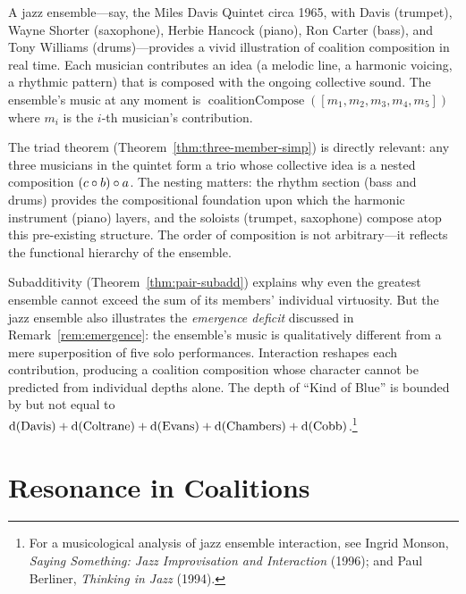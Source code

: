 \begin{example}
\label{ex:jazz}
A jazz ensemble---say, the Miles Davis Quintet circa 1965, with Davis
(trumpet), Wayne Shorter (saxophone), Herbie Hancock (piano), Ron Carter
(bass), and Tony Williams (drums)---provides a vivid illustration of
coalition composition in real time.  Each musician contributes an idea
(a melodic line, a harmonic voicing, a rhythmic pattern) that is
composed with the ongoing collective sound.  The ensemble's music at
any moment is $\operatorname{coalitionCompose}([m_1, m_2, m_3, m_4, m_5])$
where $m_i$ is the $i$-th musician's contribution.

The triad theorem (Theorem~\ref{thm:three-member-simp}) is directly
relevant: any three musicians in the quintet form a trio whose collective
idea is a nested composition $(c \circ b) \circ a$.  The nesting
matters: the rhythm section (bass and drums) provides the compositional
foundation upon which the harmonic instrument (piano) layers, and the
soloists (trumpet, saxophone) compose atop this pre-existing structure.
The order of composition is not arbitrary---it reflects the functional
hierarchy of the ensemble.

Subadditivity (Theorem~\ref{thm:pair-subadd}) explains why even the
greatest ensemble cannot exceed the sum of its members' individual
virtuosity.  But the jazz ensemble also illustrates the \emph{emergence
deficit} discussed in Remark~\ref{rem:emergence}: the ensemble's music is
qualitatively different from a mere superposition of five solo
performances.  Interaction reshapes each contribution, producing a
coalition composition whose character cannot be predicted from individual
depths alone.  The depth of ``Kind of Blue'' is bounded by but not equal to
$\operatorname{d}(\text{Davis}) + \operatorname{d}(\text{Coltrane}) + \operatorname{d}(\text{Evans}) +
\operatorname{d}(\text{Chambers}) + \operatorname{d}(\text{Cobb})$.\footnote{For a
musicological analysis of jazz ensemble interaction, see Ingrid Monson,
\textit{Saying Something: Jazz Improvisation and Interaction} (1996);
and Paul Berliner, \textit{Thinking in Jazz} (1994).}
\end{example}

\section{Resonance in Coalitions}
\label{sec:ch13-resonance}

